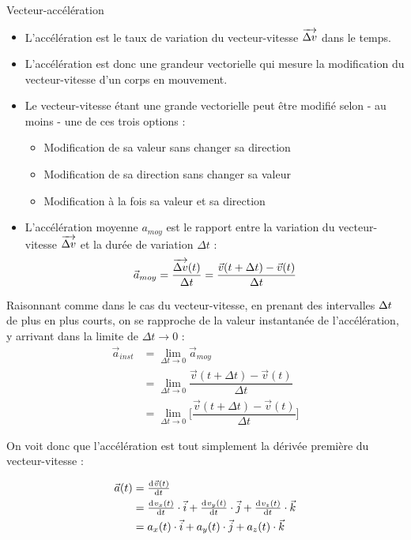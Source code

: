 \documentclass[11pt,a4paper]{article}
\begin{document}
\begin{defn}{Vecteur-accélération}
\begin{itemize}
    \item L’accélération est le taux de variation du vecteur-vitesse $ \overrightarrow{\Delta v} $ dans le temps.
    \item L’accélération est donc une grandeur vectorielle qui mesure la modification du vecteur-vitesse d’un corps en mouvement.
    \item Le vecteur-vitesse étant une grande vectorielle peut être modifié selon - au moins - une de ces trois options :
    \begin{itemize}
        \item Modification de sa valeur sans changer sa direction
        \item Modification de sa direction sans changer sa valeur
        \item Modification à la fois sa valeur et sa direction
    \end{itemize}
    \item L’accélération moyenne $a_{moy}$ est le rapport entre la variation du vecteur-vitesse $ \overrightarrow{\Delta v} $ et la durée de variation $\Delta t$ : 
    \[
    \vec{a}_{moy} = \dfrac{\overrightarrow{\Delta v}(t) }{\Delta t} = \dfrac{\vec{v}(t + \Delta t) - \vec{v}(t)}{\Delta t} 
    \]
\end{itemize}
\end{defn}
\endgroup

Raisonnant comme dans le cas du vecteur-vitesse, en prenant des intervalles $\Delta t$ de plus en plus courts, on se rapproche de la valeur instantanée de l'accélération, y arrivant dans la limite de $\Delta t \rightarrow 0 $ : 
\begin{align*}
    \Vec{a}_{inst} &= \lim_{\Delta t \to 0} \Vec{a}_{moy} \\ 
    &= \lim_{\Delta t \to 0} \dfrac{\Vec{v}(t + \Delta t) - \Vec{v}(t)}{\Delta t} \\
    &= \lim_{\Delta t \to 0} \Bigg[ \dfrac{\Vec{v}(t + \Delta t) - \Vec{v}(t)}{\Delta t} \Bigg]
\end{align*}

On voit donc que l'accélération est tout simplement la dérivée première du vecteur-vitesse : 

\begin{align*}
    \Vec{a}(t) &= \od{\Vec{v}(t)}{t} \\
    &= \od{v_x(t)}{t}\cdot \Vec{i} + \od{v_y(t)}{t}\cdot \Vec{j} + \od{v_z(t)}{t}\cdot \Vec{k} \\
    &= a_x(t)\cdot \Vec{i} + a_y(t)\cdot \Vec{j} + a_z(t)\cdot \Vec{k}
\end{align*}
\end{document}
